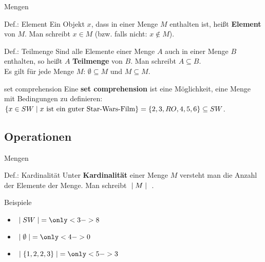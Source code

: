 	\begin{frame}{Mengen}
		\begin{block}{Def.: Element}
			Ein Objekt $x$, dass in einer Menge $M$ enthalten ist, heißt \textbf{Element} von $M$. Man schreibt $x \in M$ (bzw. falls nicht: $x \notin M$).			
		\end{block}

		\begin{block}{Def.: Teilmenge}
			Sind alle Elemente einer Menge $A$ auch in einer Menge $B$ enthalten, so heißt $A$ \textbf{Teilmenge} von $B$. Man schreibt $A \subseteq B$.\\
			Es gilt für jede Menge $M$: $\emptyset \subseteq M$ und $M \subseteq M$.
		\end{block}
		\pause
		\begin{block}{set comprehension}
			Eine \textbf{set comprehension} ist eine Möglichkeit, eine Menge mit Bedingungen zu definieren:\\
			$\{ x \in SW \mid x \text{ ist ein guter Star-Wars-Film} \} = \{ 2,3,RO,4,5,6 \} \subseteq SW$.
		\end{block}
	\end{frame}

\subsection{Operationen}
	\begin{frame}{Mengen}
		\begin{block}{Def.: Kardinalität}
			Unter \textbf{Kardinalität} einer Menge $M$ versteht man die Anzahl der Elemente der Menge. Man schreibt $\; \mid M \mid \;$ .
		\end{block}
		\pause
		\begin{exampleblock}{Beispiele}
			\begin{itemize}
				\item $\setsize{SW} = \only<3->{8}$
				\item $\setsize{\emptyset} = \only<4->{0}$
				\item $\setsize{\{1,2,2,3\}} = \only<5->{3}$
			\end{itemize}
		\end{exampleblock}
	\end{frame}

